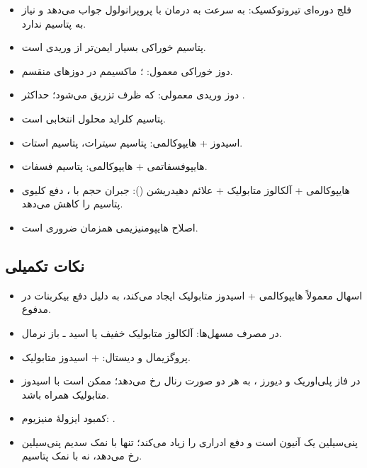 \documentclass[11pt,a4paper]{article}
\begin{document}
\begin{itemize}
\item فلج دوره‌ای تیروتوکسیک: به سرعت به درمان با پروپرانولول جواب می‌دهد و نیاز به پتاسیم ندارد.
\item پتاسیم خوراکی بسیار ایمن‌تر از وریدی است.
\item دوز خوراکی معمول: ؛ ماکسیمم  در دوزهای منقسم.
\item دوز وریدی معمولی:  که ظرف  تزریق می‌شود؛ حداکثر .
\item پتاسیم کلراید محلول انتخابی است.
\item اسیدوز + هایپوکالمی: پتاسیم سیترات، پتاسیم استات.
\item هایپوفسفاتمی + هایپوکالمی: پتاسیم فسفات.
\item هایپوکالمی + آلکالوز متابولیک + علائم دهیدریشن (): جبران حجم با ، دفع کلیوی پتاسیم را کاهش می‌دهد.
\item اصلاح هایپومنیزیمی همزمان ضروری است.
\end{itemize}
\subsection*{نکات تکمیلی}
\begin{itemize}
\item اسهال معمولاً هایپوکالمی + اسیدوز متابولیک ایجاد می‌کند، به دلیل دفع بیکربنات در مدفوع.
\item در مصرف مسهل‌ها: آلکالوز متابولیک خفیف یا اسید ـ باز نرمال.
\item {} پروگزیمال و دیستال:  + اسیدوز متابولیک.
\item در فاز پلی‌اوریک  و دیورز ، به هر دو صورت رنال  رخ می‌دهد؛ ممکن است با اسیدوز متابولیک همراه باشد.
\item کمبود ایزولهٔ منیزیوم: .
\item پنی‌سیلین یک آنیون است و دفع ادراری  را زیاد می‌کند؛ تنها با نمک سدیم پنی‌سیلین رخ می‌دهد، نه با نمک پتاسیم.
\end{itemize}

\endgroup
\ifKDisordersStandalone
  \expandafter\enddocument
\fi
\end{document}
